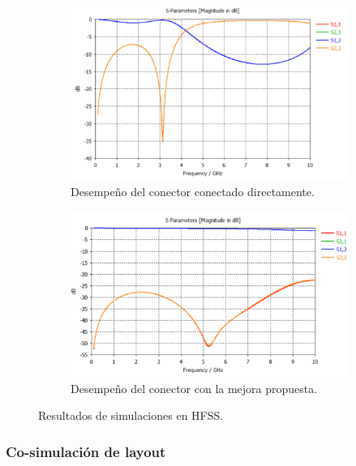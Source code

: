 \begin{figure}
    \centering

    \begin{subfigure}[b]{0.45\textwidth}
        \includegraphics[width=\textwidth]{images/sma_simulation_result.png}
        \caption{Desempeño del conector conectado directamente.}
        \label{fig:sma_simulation_result}
    \end{subfigure}
    \hfill
    \begin{subfigure}[b]{0.45\textwidth}
        \includegraphics[width=\textwidth]{images/sma_improvement_result.png}
        \caption{Desempeño del conector con la mejora propuesta.}
        \label{fig:sma_improvement_result}
    \end{subfigure}

    \caption{Resultados de simulaciones en HFSS.}
    \label{fig:sma_simulations_results}
\end{figure}

\subsubsection{Co-simulación de layout}

